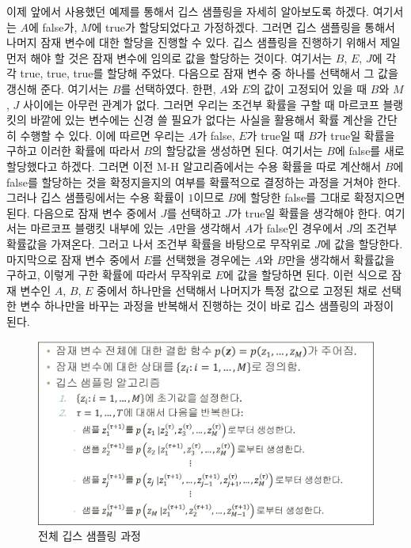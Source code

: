 \documentclass[a4paper]{oblivoir}
\begin{document}
이제 앞에서 사용했던 예제를 통해서 깁스 샘플링을 자세히 알아보도록 하겠다. 여기서는 $A$에 false가, $M$에 true가 할당되었다고 가정하겠다. 그러면 깁스 샘플링을 통해서 나머지 잠재 변수에 대한 할당을 진행할 수 있다. 깁스 샘플링을 진행하기 위해서 제일 먼저 해야 할 것은 잠재 변수에 임의로 값을 할당하는 것이다. 여기서는 $B$, $E$, $J$에 각각 true, true, true를 할당해 주었다. 다음으로 잠재 변수 중 하나를 선택해서 그 값을 갱신해 준다. 여기서는 $B$를 선택하였다. 한편, $A$와 $E$의 값이 고정되어 있을 때 $B$와 $M$, $J$ 사이에는 아무런 관계가 없다. 그러면 우리는 조건부 확률을 구할 때 마르코프 블랭킷의 바깥에 있는 변수에는 신경 쓸 필요가 없다는 사실을 활용해서 확률 계산을 간단히 수행할 수 있다. 이에 따르면 우리는 $A$가 false, $E$가 true일 때 $B$가 true일 확률을 구하고 이러한 확률에 따라서 $B$의 할당값을 생성하면 된다. 여기서는 $B$에 false를 새로 할당했다고 하겠다. 그러면 이전 M-H 알고리즘에서는 수용 확률을 따로 계산해서 $B$에 false를 할당하는 것을 확정지을지의 여부를 확률적으로 결정하는 과정을 거쳐야 한다. 그러나 깁스 샘플링에서는 수용 확률이 $1$이므로 $B$에 할당한 false를 그대로 확정지으면 된다. 다음으로 잠재 변수 중에서 $J$를 선택하고 $J$가 true일 확률을 생각해야 한다. 여기서는 마르코프 블랭킷 내부에 있는 $A$만을 생각해서 $A$가 false인 경우에서 $J$의 조건부 확률값을 가져온다. 그러고 나서 조건부 확률을 바탕으로 무작위로 $J$에 값을 할당한다. 마지막으로 잠재 변수 중에서 $E$를 선택했을 경우에는 $A$와 $B$만을 생각해서 확률값을 구하고, 이렇게 구한 확률에 따라서 무작위로 $E$에 값을 할당하면 된다. 이런 식으로 잠재 변수인 $A$, $B$, $E$ 중에서 하나만을 선택해서 나머지가 특정 값으로 고정된 채로 선택한 변수 하나만을 바꾸는 과정을 반복해서 진행하는 것이 바로 깁스 샘플링의 과정이 된다. \\

\begin{figure}[ht] \centering 
\includegraphics[scale=0.45]{fig10_17.png} 
\caption{전체 깁스 샘플링 과정}
\label{fig:10-18}
\end{figure}
\end{document}
